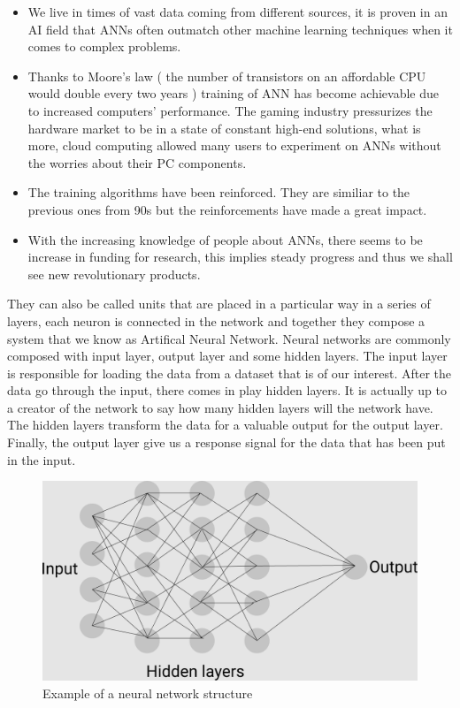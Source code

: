 \documentclass[a4paper,oneside,openright,11pt]{book}
\begin{document}
\begin{itemize}
    \item We live in times of vast data coming from different sources, it is proven in an AI field that ANNs often outmatch other machine learning techniques when it comes to complex problems.
    \item Thanks to Moore's law ( the number of transistors on an affordable CPU would double every two years \cite{intel}) training of ANN has become achievable due to increased computers' performance. The gaming industry pressurizes the hardware market to be in a state of constant high-end solutions, what is more, cloud computing allowed many users to experiment on ANNs without the worries about their PC components.
    \item The training algorithms have been reinforced. They are similiar to the previous ones from 90s but the reinforcements have made a great impact.
    \item With the increasing knowledge of people about ANNs, there seems to be increase in funding for research, this implies steady progress and thus we shall see new revolutionary products.
\end{itemize}




They can also be called units that are placed in a particular way in a series of layers, each neuron is connected in the network and together they compose a system that we know as Artifical Neural Network. Neural networks are commonly composed with input layer, output layer and some hidden layers. The input layer is responsible for loading the data from a dataset that is of our interest. After the data go through the input, there comes in play hidden layers. It is actually up to a creator of the network to say how many hidden layers will the network have. The hidden layers transform the data for a valuable output for the output layer. Finally, the output layer give us a response signal for the data that has been put in the input. 

\begin{figure}[h]
\centering
\includegraphics[scale=0.3]{DocumentFigures/MyFigures/sieci2.png}
\caption{Example of a neural network structure \cite{NNSchematic}}
\end{figure}
\end{document}
